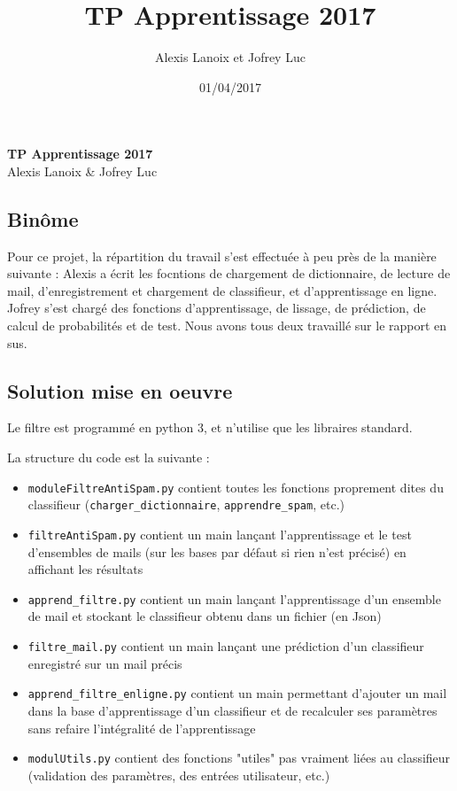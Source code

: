 \documentclass{report}
\author{Alexis Lanoix et Jofrey Luc}
\title{TP Apprentissage 2017}
\date{01/04/2017}
\begin{document}
\vspace{2cm}
\begin{center}
  \Large\textbf{TP Apprentissage 2017}\\
  \large{Alexis Lanoix \& Jofrey Luc}
\end{center}
\vspace{1cm}

\subsection*{Binôme}

Pour ce projet, la répartition du travail s'est effectuée à peu près de la manière suivante : Alexis a écrit les focntions de chargement de dictionnaire, de lecture de mail, d'enregistrement et chargement de classifieur, et d'apprentissage en ligne. Jofrey s'est chargé des fonctions d'apprentissage, de lissage, de prédiction, de calcul de probabilités et de test. Nous avons tous deux travaillé sur le rapport en sus.

\subsection*{Solution mise en oeuvre}

Le filtre est programmé en python 3, et n'utilise que les libraires standard.

La structure du code est la suivante : 
\begin{itemize}
\item \verb|moduleFiltreAntiSpam.py| contient toutes les fonctions proprement dites du classifieur (\verb|charger_dictionnaire|, \verb|apprendre_spam|, etc.)
\item \verb|filtreAntiSpam.py| contient un main lançant l'apprentissage et le test d'ensembles de mails (sur les bases par défaut si rien n'est précisé) en affichant les résultats
\item \verb|apprend_filtre.py| contient un main lançant l'apprentissage d'un ensemble de mail et stockant le classifieur obtenu dans un fichier (en Json)
\item \verb|filtre_mail.py| contient un main lançant une prédiction d'un classifieur enregistré sur un mail précis
\item \verb|apprend_filtre_enligne.py| contient un main permettant d'ajouter un mail dans la base d'apprentissage d'un classifieur et de recalculer ses paramètres sans refaire l'intégralité de l'apprentissage
\item \verb|modulUtils.py| contient des fonctions "utiles" pas vraiment liées au classifieur (validation des paramètres, des entrées utilisateur, etc.)
\end{itemize}
\end{document}
